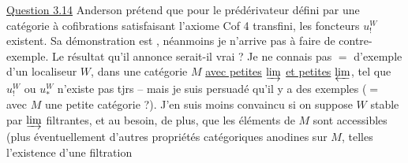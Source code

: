\uline{Question 3.14} Anderson prétend que pour
le prédérivateur défini par une catégorie
à cofibrations satisfaisant l'axiome Cof 4
transfini, les foncteurs $u^W_!$ existent.
Sa démonstration est  
, néanmoins je n'arrive pas
à faire de contre-exemple. Le résultat
qu'il annonce serait-il vrai ? Je
ne connais pas $=$ d'exemple d'un
localiseur $W$, dans une catégorie $M$
\uline{avec petites} $\varinjlim$ \uline{et petites} $\varprojlim$,
tel que  $u^W_!$ ou $u^W_*$ n'existe
pas tjrs -- mais je suis persuadé
qu'il y a des exemples ($=$ avec $M$
une petite catégorie ?). J'en suis
moins convaincu si on suppose
$W$ stable par $\varinjlim$ filtrantes, et au
besoin, de plus, que les éléments de
$M$ sont accessibles (plus éventuellement
d'autres propriétés catégoriques anodines
sur $M$, telles l'existence d'une filtration
